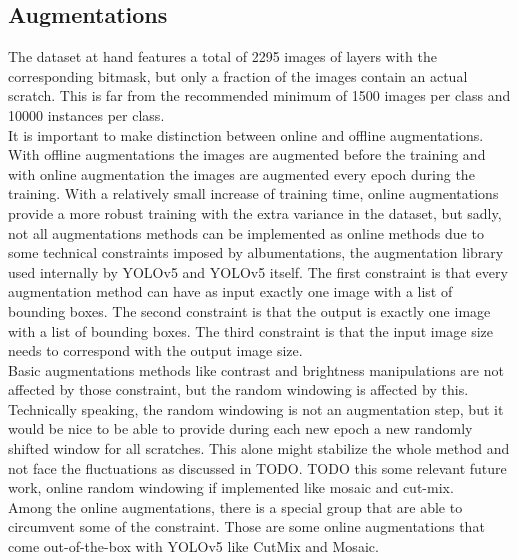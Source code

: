\subsection{Augmentations}
The dataset at hand features a total of 2295 images of layers with the corresponding bitmask, but only a fraction of the images contain an actual scratch. This is far from the recommended minimum of 1500 images per class and 10000 instances per class. \\
It is important to make distinction between online and offline augmentations. With offline augmentations the images are augmented before the training and with online augmentation the images are augmented every epoch during the training. With a relatively small increase of training time, online augmentations provide a more robust training with the extra variance in the dataset, but sadly, not all augmentations methods can be implemented as online methods due to some technical constraints imposed by albumentations, the augmentation library used internally by YOLOv5 and YOLOv5 itself. The first constraint is that every augmentation method can have as input exactly one image with a list of bounding boxes. The second constraint is that the output is exactly one image with a list of bounding boxes. The third constraint is that the input image size needs to correspond with the output image size. \\
Basic augmentations methods like contrast and brightness manipulations are not affected by those constraint, but the random windowing is affected by this. Technically speaking, the random windowing is not an augmentation step, but it would be nice to be able to provide during each new epoch a new randomly shifted window for all scratches. This alone might stabilize the whole method and not face the fluctuations as discussed in TODO. TODO this some relevant future work, online random windowing if implemented like mosaic and cut-mix.\\
Among the online augmentations, there is a special group that are able to circumvent some of the constraint. Those are some online augmentations that come out-of-the-box with YOLOv5 like CutMix and Mosaic. \\


